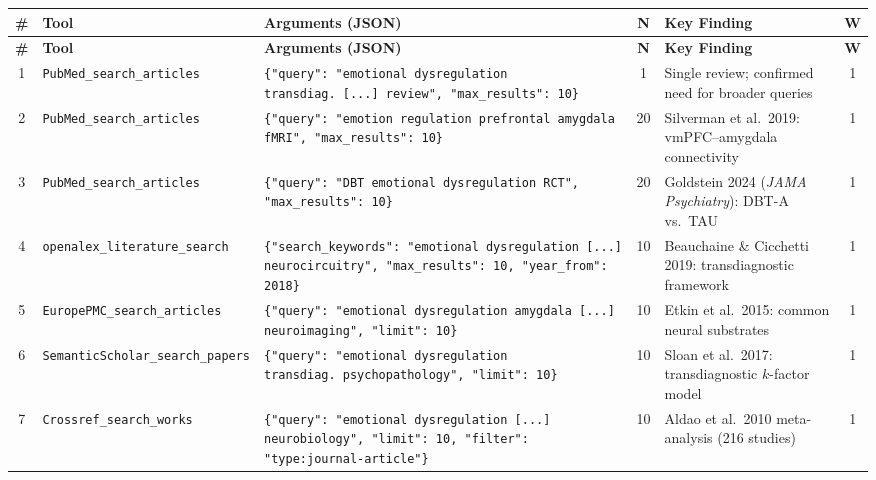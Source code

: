 {\small
\setlength{\LTleft}{-1cm}
\setlength{\LTright}{-1cm}
\begin{longtable}{@{}c p{2.2cm} p{4.5cm} c p{4cm} c@{}}
\toprule
\textbf{\#} & \textbf{Tool} & \textbf{Arguments (JSON)} &
\textbf{N} & \textbf{Key Finding} & \textbf{W} \\
\midrule
\endfirsthead
\toprule
\textbf{\#} & \textbf{Tool} & \textbf{Arguments (JSON)} &
\textbf{N} & \textbf{Key Finding} & \textbf{W} \\
\midrule
\endhead
\bottomrule
\endlastfoot


1 &
\texttt{PubMed\_search\_\allowbreak articles} &
\texttt{\{"query": "emotional dysregulation transdiag.\ [...] review", "max\_results": 10\}} &
1 &
Single review; confirmed need for broader queries &
1 \\
\midrule

2 &
\texttt{PubMed\_search\_\allowbreak articles} &
\texttt{\{"query": "emotion regulation prefrontal amygdala fMRI", "max\_results": 10\}} &
20 &
Silverman et al.\ 2019: vmPFC--amygdala connectivity &
1 \\
\midrule

3 &
\texttt{PubMed\_search\_\allowbreak articles} &
\texttt{\{"query": "DBT emotional dysregulation RCT", "max\_results": 10\}} &
20 &
Goldstein 2024 (\emph{JAMA Psychiatry}): DBT-A vs.\ TAU &
1 \\
\midrule

4 &
\texttt{openalex\_\allowbreak literature\_\allowbreak search} &
\texttt{\{"search\_keywords": "emotional dysregulation [...] neurocircuitry", "max\_results": 10, "year\_from": 2018\}} &
10 &
Beauchaine \& Cicchetti 2019: transdiagnostic framework &
1 \\
\midrule

5 &
\texttt{EuropePMC\_\allowbreak search\_\allowbreak articles} &
\texttt{\{"query": "emotional dysregulation amygdala [...] neuroimaging", "limit": 10\}} &
10 &
Etkin et al.\ 2015: common neural substrates &
1 \\
\midrule

6 &
\texttt{Semantic\allowbreak Scholar\_\allowbreak search\_papers} &
\texttt{\{"query": "emotional dysregulation transdiag.\ psychopathology", "limit": 10\}} &
10 &
Sloan et al.\ 2017: transdiagnostic $k$-factor model &
1 \\
\midrule

7 &
\texttt{Crossref\_\allowbreak search\_works} &
\texttt{\{"query": "emotional dysregulation [...] neurobiology", "limit": 10, "filter": "type:journal-article"\}} &
10 &
Aldao et al.\ 2010 meta-analysis (216 studies) &
1 \\
\midrule


\end{longtable}}
